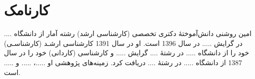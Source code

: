\vspace*{1.5cm}
\thispagestyle{empty}
\section*{کارنامک}
\vspace*{1cm}
امین روشنی دانش‌آموختۀ دکتری تخصصی (کارشناسی ارشد) رشته آمار از دانشگاه .... در گرایش ..... در سال 1396 است. او در سال 1391 كارشناسی ارشـد (كارشناسـی) خود را از دانشگاه ..... در رشتۀ .... گرایش ..... و كارشناسی (کاردانی) خود را در سال 1387 از دانشگاه ..... در رشتۀ .... دریافت كرد. زمينه‌های پژوهشی او .....، ..... و ..... است.